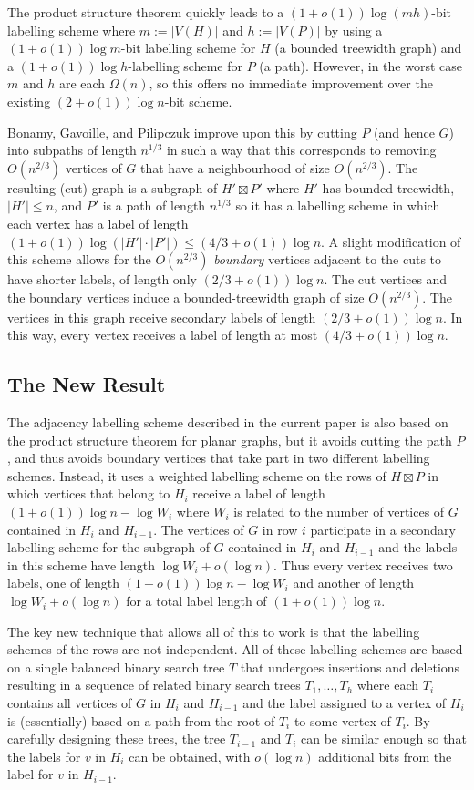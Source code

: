 \documentclass[kpfonts]{patmorin}
\begin{document}
The product structure theorem quickly leads to a $(1+o(1))\log(mh)$-bit labelling scheme where $m:=|V(H)|$ and $h:=|V(P)|$ by using a $(1+o(1))\log m$-bit labelling scheme for $H$ (a bounded treewidth graph) and a $(1+o(1))\log h$-labelling scheme for $P$ (a path).  However, in the worst case $m$ and $h$ are each $\Omega(n)$, so this offers no immediate improvement over the existing $(2+o(1))\log n$-bit scheme.

Bonamy, Gavoille, and Pilipczuk improve upon this by cutting $P$ (and hence $G$) into subpaths of length $n^{1/3}$ in such a way that this corresponds to removing $O(n^{2/3})$ vertices of $G$ that have a neighbourhood of size $O(n^{2/3})$. The resulting (cut) graph is a subgraph of $H'\boxtimes P'$ where $H'$ has bounded treewidth, $|H'|\le n$, and $P'$ is a path of length $n^{1/3}$ so it has a labelling scheme in which each vertex has a label of length $(1+o(1))\log (|H'|\cdot|P'|) \le (4/3+o(1))\log n$.  A slight modification of this scheme allows for the $O(n^{2/3})$ \emph{boundary} vertices adjacent to the cuts to have shorter labels, of length only $(2/3+o(1))\log n$.  The cut vertices and the boundary vertices induce a bounded-treewidth graph of size $O(n^{2/3})$.  The vertices in this graph receive secondary labels of length $(2/3+o(1))\log n$.  In this way, every vertex receives a label of length at most $(4/3 + o(1))\log n$.

\subsection{The New Result}

The adjacency labelling scheme described in the current paper is also based on the product structure theorem for planar graphs, but it avoids cutting the path $P$, and thus avoids boundary vertices that take part in two different labelling schemes.  Instead, it uses a weighted labelling scheme on the rows of $H\boxtimes P$ in which vertices that belong to $H_i$ receive a label of length $(1+o(1))\log n-\log W_i$ where $W_i$ is related to the number of vertices of $G$ contained in $H_i$ and $H_{i-1}$.  The vertices of $G$ in row $i$ participate in a secondary labelling scheme for the subgraph of $G$ contained in $H_i$ and $H_{i-1}$ and the labels in this scheme have length $\log W_i + o(\log n)$. Thus every vertex receives two labels, one of length $(1+o(1))\log n-\log W_i$ and another of length $\log W_i + o(\log n)$ for a total label length of $(1+o(1))\log n$.  

The key new technique that allows all of this to work is that the labelling schemes of the rows are not independent.  All of these labelling schemes are based on a single balanced binary search tree $T$ that undergoes insertions and deletions resulting in a sequence of related binary search trees $T_1,\ldots,T_h$ where each $T_i$ contains all vertices of $G$ in $H_{i}$ and $H_{i-1}$ and the label assigned to a vertex of $H_i$ is (essentially) based on a path from the root of $T_i$ to some vertex of $T_i$.  By carefully designing these trees, the tree $T_{i-1}$ and $T_{i}$ can be similar enough so that the labels for $v$ in $H_i$ can be obtained, with $o(\log n)$ additional bits from the label for $v$ in $H_{i-1}$.
\end{document}
